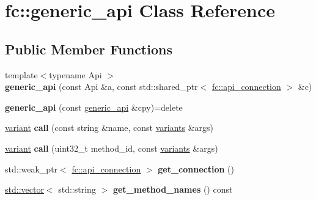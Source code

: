 \hypertarget{classfc_1_1generic__api}{}\section{fc\+:\+:generic\+\_\+api Class Reference}
\label{classfc_1_1generic__api}
\subsection*{Public Member Functions}
\begin{DoxyCompactItemize}
\item 
\mbox{\label{classfc_1_1generic__api_afd5e38e1a2fbbc91a46570914c82c6bf}} 
{\footnotesize template$<$typename Api $>$ }\\{\bfseries generic\+\_\+api} (const Api \&a, const std\+::shared\+\_\+ptr$<$ \mbox{\hyperlink{classfc_1_1api__connection}{fc\+::api\+\_\+connection}} $>$ \&c)
\item 
\mbox{\label{classfc_1_1generic__api_a365a087172afae4eaeb824549461f776}} 
{\bfseries generic\+\_\+api} (const \mbox{\hyperlink{classfc_1_1generic__api}{generic\+\_\+api}} \&cpy)=delete
\item 
\mbox{\label{classfc_1_1generic__api_acca08c171f127e0f4a0455ba301ae764}} 
\mbox{\hyperlink{classfc_1_1variant}{variant}} {\bfseries call} (const string \&name, const \mbox{\hyperlink{classstd_1_1vector}{variants}} \&args)
\item 
\mbox{\label{classfc_1_1generic__api_a4f98353315e6adddd7bfe0ed006209ee}} 
\mbox{\hyperlink{classfc_1_1variant}{variant}} {\bfseries call} (uint32\+\_\+t method\+\_\+id, const \mbox{\hyperlink{classstd_1_1vector}{variants}} \&args)
\item 
\mbox{\label{classfc_1_1generic__api_a7b89999fe73005a684a8344dae617a21}} 
std\+::weak\+\_\+ptr$<$ \mbox{\hyperlink{classfc_1_1api__connection}{fc\+::api\+\_\+connection}} $>$ {\bfseries get\+\_\+connection} ()
\item 
\mbox{\label{classfc_1_1generic__api_acc07b1c516bf195c219d416d03a1307a}} 
\mbox{\hyperlink{classstd_1_1vector}{std\+::vector}}$<$ std\+::string $>$ {\bfseries get\+\_\+method\+\_\+names} () const

\end{DoxyCompactItemize}
